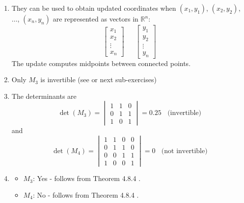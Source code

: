\documentclass{article}
\begin{document}
\begin{enumerate}[label = (\arabic*)]
	\item They can be used to obtain updated coordinates when $(x_1, y_1)$, $(x_2, y_2)$, $\dots$, $(x_n, y_n)$ are represented as vectors in $\mathbb{R}^n$:
	\[
		\begin{bmatrix}
			x_1 \\ x_2 \\ \vdots \\ x_n
		\end{bmatrix} \ \ \ \ \ \ \ 
		\begin{bmatrix}
		y_1 \\ y_2 \\ \vdots \\ y_n
		\end{bmatrix}
	\]
	The update computes midpoints between connected points.	 

	\item Only $M_3$ is invertible (see \cite[p.~25]{random_polygon} or next sub-exercises)
	
	\item The determinants are
	\[
		\det(M_3) = \begin{vmatrix}
		1 & 1 & 0 \\
		0 & 1 & 1 \\
		1 & 0 & 1 
		\end{vmatrix} = 0.25 \ \ \ \ \text{(invertible)}
	\]
	and 
	\[
		\det(M_4) = \begin{vmatrix}
		1 & 1 & 0 & 0 \\
		0 & 1 & 1 & 0 \\
		0 & 0 & 1 & 1 \\
		1 & 0 & 0 & 1
		\end{vmatrix} = 0 \ \ \ \ \text{(not invertible)}
	\]
	
	\item 
	\begin{itemize}
		\item $M_3$: Yes - follows from Theorem 4.8.4 \cite[p.~228]{anton}.
		\item $M_4$: No - follows from Theorem 4.8.4 \cite[p.~228]{anton}.
		

\end{itemize}
\end{enumerate}
\end{document}
